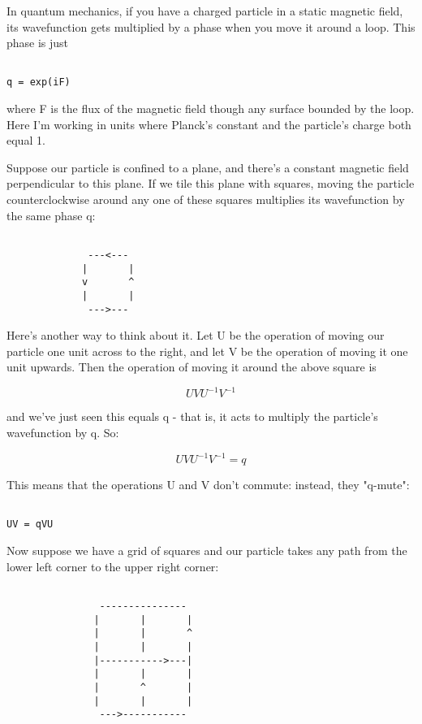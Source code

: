 In quantum mechanics, if you have a charged particle in a static
magnetic field, its wavefunction gets multiplied by a phase when 
you move it around a loop.  This phase is just


\begin{verbatim}

q = exp(iF)
\end{verbatim}
    
where F is the flux of the magnetic field though any surface bounded 
by the loop.  Here I'm working in units where Planck's constant and the 
particle's charge both equal 1.  

Suppose our particle is confined to a plane, and there's a constant
magnetic field perpendicular to this plane.   If we tile this plane 
with squares, moving the particle counterclockwise around any one of 
these squares multiplies its wavefunction by the same phase q:


\begin{verbatim}

              ---<---
             |       |
             v       ^
             |       |
              --->---
\end{verbatim}
    
Here's another way to think about it.  Let U be the operation of moving
our particle one unit across to the right, and let V be the operation of
moving it one unit upwards.  Then the operation of moving it around the
above square is


$$

U V U^{-1} V^{-1} 
$$
    
and we've just seen this equals q - that is, it acts to multiply
the particle's wavefunction by q.  So:


$$

U V U^{-1} V^{-1} = q
$$
    
This means that the operations U and V don't commute: instead, 
they "q-mute":


\begin{verbatim}

UV = qVU
\end{verbatim}
    
Now suppose we have a grid of squares and our particle takes any path
from the lower left corner to the upper right corner:


\begin{verbatim}

                ---------------
               |       |       |
               |       |       ^
               |       |       |
               |----------->---|
               |       |       |
               |       ^       |
               |       |       | 
                --->-----------
\end{verbatim}
    
